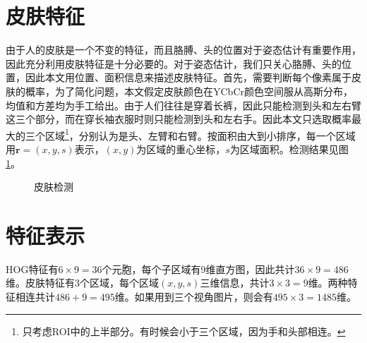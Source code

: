 \section{皮肤特征}
由于人的皮肤是一个不变的特征，而且胳膊、头的位置对于姿态估计有重要作用，因此充分利用皮肤特征是十分必要的。对于姿态估计，我们只关心胳膊、头的位置，因此本文用位置、面积信息来描述皮肤特征。首先，需要判断每个像素属于皮肤的概率，为了简化问题，本文假定皮肤颜色在YCbCr颜色空间服从高斯分布，均值和方差均为手工给出。由于人们往往是穿着长裤，因此只能检测到头和左右臂这三个部分，而在穿长袖衣服时则只能检测到头和左右手。因此本文只选取概率最大的三个区域\footnote{只考虑ROI中的上半部分。有时候会小于三个区域，因为手和头部相连。}，分别认为是头、左臂和右臂。按面积由大到小排序，每一个区域用$\mathbf{r}=(x,y,s)$表示，$(x,y)$为区域的重心坐标，$s$为区域面积。检测结果见图\ref{fig:skin}。
\begin{figure}[H]
  \centering
  \hspace{1cm}
  \caption{皮肤检测}\label{fig:skin}
\end{figure}

\section{特征表示}
\label{sec:feature}
HOG特征有$6\times 9=36$个元胞，每个子区域有9维直方图，因此共计$36\times 9=486$维。皮肤特征有3个区域，每个区域$(x,y,s)$三维信息，共计$3\times 3=9$维。两种特征相连共计$486+9=495$维。如果用到三个视角图片，则会有$495\times 3=1485$维。
